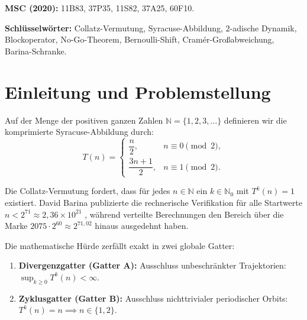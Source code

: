 \documentclass[11pt,reqno]{amsart}
\theoremstyle{definition}
\theoremstyle{remark}
\numberwithin{equation}{section}
\begin{document}
\begin{abstract}
\begin{enumerate}
\end{enumerate}
Die Analyse isoliert damit zwei weiterhin offene arithmetische Collatz-Gatter. Erstens m\"ussen s\"amtliche nichttrivialen realisierbaren Blockzyklen ausgeschlossen werden. Zweitens muss ausgeschlossen werden, dass ein unbeschr\"ankter positiver ganzzahliger Orbit dauerhaft eine Blockfolge mit nichtnegativer asymptotischer Hauptdrift realisiert. Die $2$-adische Fast-\"uberall-Statistik ersetzt keine dieser beiden universellen arithmetischen Aussagen.
\end{abstract}

\medskip

\noindent\textbf{MSC (2020):}
11B83, 37P35, 11S82, 37A25, 60F10.

\noindent\textbf{Schl\"usselw\"orter:}
Collatz-Vermutung, Syracuse-Abbildung, $2$-adische Dynamik,
Blockoperator, No-Go-Theorem, Bernoulli-Shift, Cram\'er-Gro\ss{}abweichung, Barina-Schranke.

\section{Einleitung und Problemstellung}

Auf der Menge der positiven ganzen Zahlen $\mathbb{N} = \{1, 2, 3, \ldots\}$ definieren wir die komprimierte Syracuse-Abbildung durch:
\begin{equation}
T(n) =
\begin{cases}
\dfrac{n}{2}, & n \equiv 0 \pmod 2, \\[0.8em]
\dfrac{3n+1}{2}, & n \equiv 1 \pmod 2.
\end{cases}
\label{eq:syracuse}
\end{equation}

Die Collatz-Vermutung fordert, dass f\"ur jedes $n \in \mathbb{N}$ ein $k \in \mathbb{N}_0$ mit $T^k(n) = 1$ existiert. David Barina publizierte die rechnerische Verifikation f\"ur alle Startwerte $n < 2^{71} \approx 2{,}36 \times 10^{21}$ \cite{Barina2025}, w\"ahrend verteilte Berechnungen den Bereich \"uber die Marke $2075 \cdot 2^{60} \approx 2^{71{,}02}$ hinaus ausgedehnt haben.

Die mathematische H\"urde zerfällt exakt in zwei globale Gatter:
\begin{enumerate}
\item \textbf{Divergenzgatter (Gatter A):} Ausschluss unbeschr\"ankter Trajektorien: $\sup_{k \ge 0} T^k(n) < \infty$.
\item \textbf{Zyklusgatter (Gatter B):} Ausschluss nichttrivialer periodischer Orbits: $T^k(n) = n \implies n \in \{1, 2\}$.
\end{enumerate}
\end{document}
